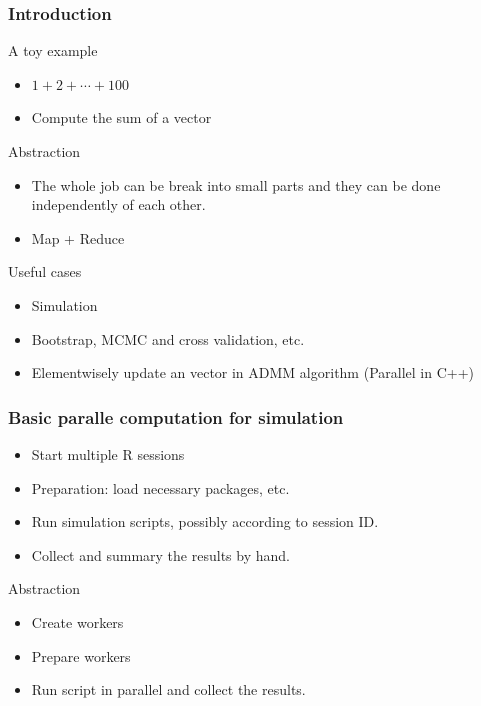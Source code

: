 \documentclass[aspectratio=169,xcolor={dvipsnames,table}]{beamer}
\begin{document}
\begin{frame}
  \frametitle{Introduction}
  \begin{block}{A toy example}
    \begin{itemize}
    \item $1 + 2 + \cdots + 100$
    \item Compute the sum of a vector
    \end{itemize}
  \end{block}
  \begin{block}{Abstraction}
    \begin{itemize}
    \item The whole job can be break into small parts and they can be done independently of each other.
    \item Map + Reduce
    \end{itemize}
  \end{block}
  \begin{block}{Useful cases}
    \begin{itemize}
    \item Simulation
    \item Bootstrap, MCMC and cross validation, etc.
    \item Elementwisely update an vector in ADMM algorithm (Parallel in C++)
    \end{itemize}
  \end{block}
\end{frame}

\begin{frame}
  \frametitle{Basic paralle computation for simulation}
  \begin{itemize}
  \item Start multiple R sessions
  \item Preparation: load necessary packages, etc.
  \item Run simulation scripts, possibly according to session ID.
  \item Collect and summary the results by hand.
  \end{itemize}
  \begin{block}{Abstraction}
    \begin{itemize}
    \item Create workers
    \item Prepare workers
    \item Run script in parallel and collect the results.
    \end{itemize}
  \end{block}
\end{frame}
\end{document}

